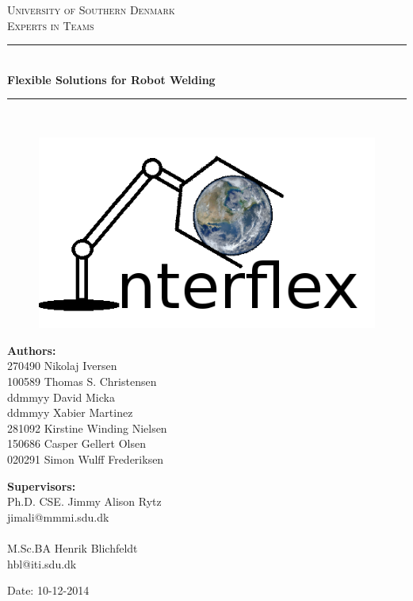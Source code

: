 \begin{titlepage}
\begin{center}

\textsc{\LARGE University of Southern Denmark}\\[1.5cm]
\textsc{\Large Experts in Teams}\\[0.5cm]
\vfill
\hrule ~\\[0.3cm]
{ \huge \bfseries Flexible Solutions for Robot Welding \\[0.4cm] }
\hrule ~\\[1.5cm]
\begin{figure}[!h]
	\centering
	\includegraphics[scale=0.1]{./graphics/logo}
\end{figure}
\vfill

\begin{minipage}[t]{7.9cm}
\begin{flushleft} \large
\textbf{Authors:}\\
270490 Nikolaj Iversen \\
100589 Thomas S. Christensen \\
ddmmyy David Micka \\
ddmmyy Xabier Martinez \\
281092 Kirstine Winding Nielsen \\
150686 Casper Gellert Olsen \\
020291 Simon Wulff Frederiksen\\
\end{flushleft}
\end{minipage}
\begin{minipage}[t]{7.9cm}
\begin{flushright} \large
\textbf{Supervisors:} \\
Ph.D. CSE. Jimmy Alison Rytz \\
jimali@mmmi.sdu.dk\\~\\
M.Sc.BA Henrik Blichfeldt\\
hbl@iti.sdu.dk\\
\end{flushright}
\end{minipage}

\vspace{1.2cm}
Date: 10-12-2014

\end{center}

\end{titlepage}
